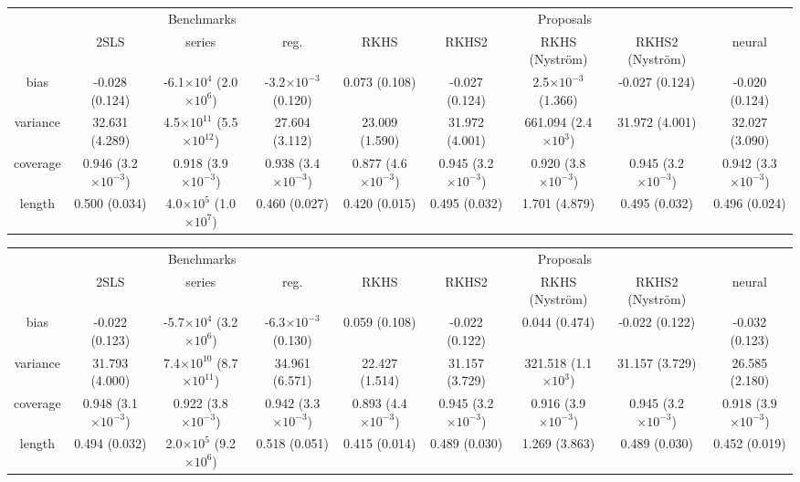 \begin{tabular}{ccccccccc}
    & \multicolumn{3}{c}{Benchmarks} & \multicolumn{5}{c}{Proposals} \tabularnewline
    \cmidrule(lr){2-4}\cmidrule(lr){5-9}
     & 2SLS & series & reg. & RKHS & RKHS2 & RKHS (Nyström) & RKHS2 (Nyström) & neural \tabularnewline
    \hline
    bias & -0.028 (0.124) & -6.1$\times 10^{4}$ (2.0$\times 10^{6}$) & -3.2$\times 10^{-3}$ (0.120) & 0.073 (0.108) & -0.027 (0.124) & 2.5$\times 10^{-3}$ (1.366) & -0.027 (0.124) & -0.020 (0.124) \tabularnewline
    variance & 32.631 (4.289) & 4.5$\times 10^{11}$ (5.5$\times 10^{12}$) & 27.604 (3.112) & 23.009 (1.590) & 31.972 (4.001) & 661.094 (2.4$\times 10^{3}$) & 31.972 (4.001) & 32.027 (3.090) \tabularnewline
    coverage & 0.946 (3.2$\times 10^{-3}$) & 0.918 (3.9$\times 10^{-3}$) & 0.938 (3.4$\times 10^{-3}$) & 0.877 (4.6$\times 10^{-3}$) & 0.945 (3.2$\times 10^{-3}$) & 0.920 (3.8$\times 10^{-3}$) & 0.945 (3.2$\times 10^{-3}$) & 0.942 (3.3$\times 10^{-3}$) \tabularnewline
    length & 0.500 (0.034) & 4.0$\times 10^{5}$ (1.0$\times 10^{7}$) & 0.460 (0.027) & 0.420 (0.015) & 0.495 (0.032) & 1.701 (4.879) & 0.495 (0.032) & 0.496 (0.024) \tabularnewline
    \hline
\end{tabular}

\begin{tabular}{ccccccccc}
    & \multicolumn{3}{c}{Benchmarks} & \multicolumn{5}{c}{Proposals} \tabularnewline
    \cmidrule(lr){2-4}\cmidrule(lr){5-9}
     & 2SLS & series & reg. & RKHS & RKHS2 & RKHS (Nyström) & RKHS2 (Nyström) & neural \tabularnewline
    \hline
    bias & -0.022 (0.123) & -5.7$\times 10^{4}$ (3.2$\times 10^{6}$) & -6.3$\times 10^{-3}$ (0.130) & 0.059 (0.108) & -0.022 (0.122) & 0.044 (0.474) & -0.022 (0.122) & -0.032 (0.123) \tabularnewline
    variance & 31.793 (4.000) & 7.4$\times 10^{10}$ (8.7$\times 10^{11}$) & 34.961 (6.571) & 22.427 (1.514) & 31.157 (3.729) & 321.518 (1.1$\times 10^{3}$) & 31.157 (3.729) & 26.585 (2.180) \tabularnewline
    coverage & 0.948 (3.1$\times 10^{-3}$) & 0.922 (3.8$\times 10^{-3}$) & 0.942 (3.3$\times 10^{-3}$) & 0.893 (4.4$\times 10^{-3}$) & 0.945 (3.2$\times 10^{-3}$) & 0.916 (3.9$\times 10^{-3}$) & 0.945 (3.2$\times 10^{-3}$) & 0.918 (3.9$\times 10^{-3}$) \tabularnewline
    length & 0.494 (0.032) & 2.0$\times 10^{5}$ (9.2$\times 10^{6}$) & 0.518 (0.051) & 0.415 (0.014) & 0.489 (0.030) & 1.269 (3.863) & 0.489 (0.030) & 0.452 (0.019) \tabularnewline
    \hline
\end{tabular}

